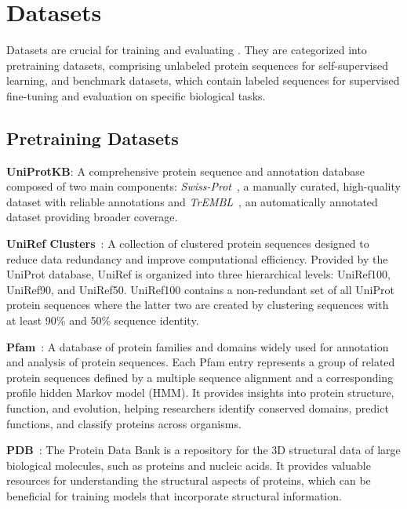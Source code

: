 \section{Datasets}
\label{sec:dataset}
Datasets are crucial for training and evaluating \proteinllms. They are categorized into pretraining datasets, comprising unlabeled protein sequences for self-supervised learning, and benchmark datasets, which contain labeled sequences for supervised fine-tuning and evaluation on specific biological tasks.

\subsection{Pretraining Datasets}

\smallskip \noindent \textbf{UniProtKB}: A comprehensive protein sequence and annotation database composed of two main components: \textit{Swiss-Prot}~\cite{boutet2016uniprotkb}, a manually curated, high-quality dataset with reliable annotations and \textit{TrEMBL}~\cite{m1999edittotrembl}, an automatically annotated dataset providing broader coverage. 

\smallskip \noindent \textbf{UniRef Clusters}~\cite{suzek2015uniref}: A collection of clustered protein sequences designed to reduce data redundancy and improve computational efficiency. Provided by the UniProt database, UniRef is organized into three hierarchical levels: UniRef100, UniRef90, and UniRef50. UniRef100 contains a non-redundant set of all UniProt protein sequences where the latter two are created by clustering sequences with at least 90\% and 50\% sequence identity.

\smallskip \noindent \textbf{Pfam}~\cite{finn2006pfam}: A database of protein families and domains widely used for annotation and analysis of protein sequences. Each Pfam entry represents a group of related protein sequences defined by a multiple sequence alignment and a corresponding profile hidden Markov model (HMM). It provides insights into protein structure, function, and evolution, helping researchers identify conserved domains, predict functions, and classify proteins across organisms.

\smallskip \noindent \textbf{PDB}~\cite{bank1971crystallography}: The Protein Data Bank is a repository for the 3D structural data of large biological molecules, such as proteins and nucleic acids. It provides valuable resources for understanding the structural aspects of proteins, which can be beneficial for training models that incorporate structural information.

